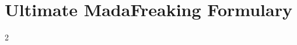 \documentclass{article}
\begin{document}
\thispagestyle{empty}
\section*{Ultimate MadaFreaking Formulary}
\begin{multicols}{2}
\tableofcontents  
\end{multicols}
\newpage

\newpage

\newpage

\newpage

\newpage

\end{document}
